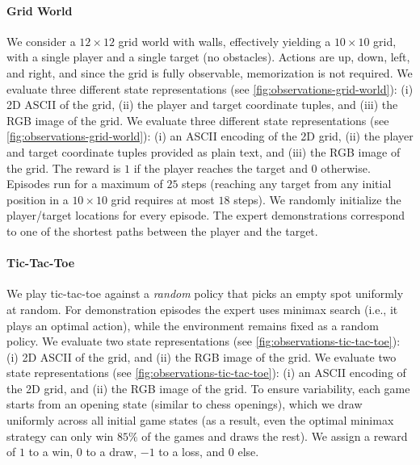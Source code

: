 \documentclass{article}
\newcommand{\ie}{i.e., }
\begin{document}
\paragraph{Grid World}
We consider a $12\times12$ grid world with walls, effectively yielding a $10\times10$ grid, with a single player and a single target (no obstacles).
Actions are up, down, left, and right, and since the grid is fully observable, memorization is not required.
\ificlr
We evaluate three different state representations (see \cref{fig:observations-grid-world}): (i) 2D ASCII of the grid, (ii) the player and target coordinate tuples, and (iii) the RGB image of the grid.
\else
We evaluate three different state representations (see \cref{fig:observations-grid-world}): (i) an ASCII encoding of the 2D grid, (ii) the player and target coordinate tuples provided as plain text, and (iii) the RGB image of the grid.
\fi
The reward is $1$ if the player reaches the target and $0$ otherwise.
Episodes run for a maximum of $25$ steps (reaching any target from any initial position in a $10\times10$ grid requires at most $18$ steps).
We randomly initialize the player/target locations for every episode.
The expert demonstrations correspond to one of the shortest paths between the player and the target.
\paragraph{Tic-Tac-Toe}
We play tic-tac-toe against a \emph{random} policy that picks an empty spot uniformly at random.
For demonstration episodes the expert uses minimax search (\ie it plays an optimal action), while the environment remains fixed as a random policy.
\ificlr
We evaluate two state representations (see \cref{fig:observations-tic-tac-toe}): (i) 2D ASCII of the grid, and (ii) the RGB image of the grid.
\else
We evaluate two state representations (see \cref{fig:observations-tic-tac-toe}): (i) an ASCII encoding of the 2D grid, and (ii) the RGB image of the grid.
\fi
To ensure variability, each game starts from an opening state (similar to chess openings), which we draw uniformly across all initial game states (as a result, even the optimal minimax strategy can only win $85\%$ of the games and draws the rest).
We assign a reward of $1$ to a win, $0$ to a draw, $-1$ to a loss, and $0$ else.
\end{document}
